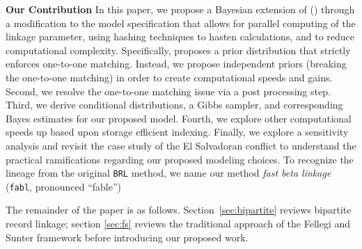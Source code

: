 \documentclass[12pt,letterpaper]{article}
\newcommand{\1}[1]{\mathbb{I}\!\left[#1\right]} %
\begin{document}
\textbf{Our Contribution} 
In this paper, we propose a Bayesian extension of \cite{sadinle_bayesian_2017} () through a modification to the model specification that allows for parallel computing of the linkage parameter, using hashing techniques to hasten calculations, and to reduce computational complexity.  Specifically, \cite{sadinle_bayesian_2017} proposes a prior distribution that strictly enforces one-to-one matching. Instead, we propose independent priors (breaking the one-to-one matching) in order to create computational speeds and gains. Second, we resolve the one-to-one matching issue via a post processing step. Third, we derive conditional distributions, a Gibbs sampler, and corresponding Bayes estimates for our proposed model. Fourth, we explore other computational speeds up based upon storage efficient indexing. Finally, we explore a sensitivity analysis and revisit the case study of the El Salvadoran conflict to understand the practical ramifications regarding our proposed modeling choices. 
To recognize the lineage from the original \texttt{BRL} method, we name our method \emph{fast beta linkage} (\texttt{fabl},
pronounced ``fable'')

The remainder of the paper is as follows. Section~\ref{sec:bipartite} reviews bipartite record linkage; section \ref{sec:fs} reviews the traditional approach of the Fellegi and Sunter framework before introducing our proposed work. 
\end{document}
